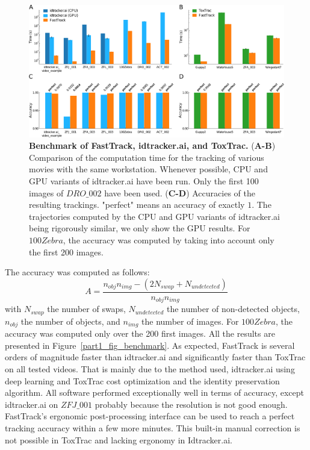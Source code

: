 	\begin{figure}[h!]
    \centering
    \includegraphics[width=\textwidth]{part_1/assets/Figure_benchmark.png}
    \caption{{\bf Benchmark of FastTrack, idtracker.ai, and ToxTrac.}
        (\textbf{A-B}) Comparison of the computation time for the tracking of various movies with the same workstation. Whenever possible, CPU and GPU variants of idtracker.ai have been run. Only the first 100 images of $DRO\_002$ have been used.
        (\textbf{C-D}) Accuracies of the resulting trackings. "perfect" means an accuracy of exactly $1$. The trajectories computed by the CPU and GPU variants of idtracker.ai being rigorously similar, we only show the GPU results. For $100Zebra$, the accuracy was computed by taking into account only the first 200 images.}
    \label{part_1:fig_benchmark}
    \end{figure}

    The accuracy was computed as follows:
    $$ A=\frac{n_{obj}n_{img} - (2N_{swap} + N_{undetected})}{n_{obj}n_{img}}$$
    with $N_{swap}$ the number of swaps, $N_{undetected}$ the number of non-detected objects, $n_{obj}$ the number of objects, and $n_{img}$ the number of images.
    For $100Zebra$, the accuracy was computed only over the 200 first images. All the results are presented in Figure~\ref{part1_fig_benchmark}. As expected, FastTrack is several orders of magnitude faster than idtracker.ai and significantly faster than ToxTrac on all tested videos. That is mainly due to the method used, idtracker.ai using deep learning and ToxTrac cost optimization and the identity preservation algorithm.
    All software performed exceptionally well in terms of accuracy, except idtracker.ai on $ZFJ\_001$ probably because the resolution is not good enough.
    FastTrack's ergonomic post-processing interface can be used to reach a perfect tracking accuracy within a few more minutes. This built-in manual correction is not possible in ToxTrac and lacking ergonomy in Idtracker.ai.

